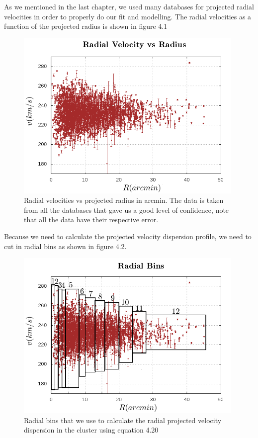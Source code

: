 As we mentioned in the last chapter, we used many databases for projected radial velocities in order to properly do our fit and modelling. The radial velocities as a function of the projected radius is shown in figure 4.1

\begin{figure}[H]
\centering
\includegraphics[width=11cm]{images/vel_vs_rad.png}
\caption[Radial velocity database]{Radial velocities vs projected radius in arcmin. The data is taken from all the databases that gave us a good level of confidence, note that all the data have their respective error.}
\end{figure}

Because we need to calculate the projected velocity dispersion profile, we need to cut in radial bins as shown in figure 4.2. 

\begin{figure}[H]
\centering
\includegraphics[width=11cm]{images/vel_vs_rad_bins.png}
\caption[Radial bins used to calculate velocity dispersions]{Radial bins that we use to calculate the radial projected velocity dispersion in the cluster using equation 4.20}
\end{figure}

